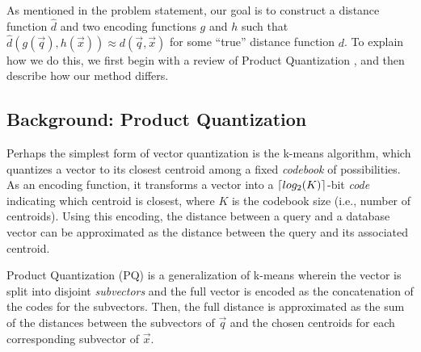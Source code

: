 
As mentioned in the problem statement, our goal is to construct a distance function $\hat{d}$ and two encoding functions $g$ and $h$ such that $\hat{d}(g(\vec{q}), h(\vec{x})) \approx d(\vec{q}, \vec{x})$ for some ``true'' distance function $d$. To explain how we do this, we first begin with a review of Product Quantization \cite{pq}, and then describe how our method differs.

\subsection{Background: Product Quantization}

Perhaps the simplest form of vector quantization is the k-means algorithm, which quantizes a vector to its closest centroid among a fixed \textit{codebook} of possibilities. As an encoding function, it transforms a vector into a $\lceil log_2(K)\rceil$-bit \textit{code} indicating which centroid is closest, where $K$ is the codebook size (i.e., number of centroids). Using this encoding, the distance between a query and a database vector can be approximated as the distance between the query and its associated centroid.

Product Quantization (PQ) is a generalization of k-means wherein the vector is split into disjoint \textit{subvectors} and the full vector is encoded as the concatenation of the codes for the subvectors. Then, the full distance is approximated as the sum of the distances between the subvectors of $\vec{q}$ and the chosen centroids for each corresponding subvector of $\vec{x}$.

